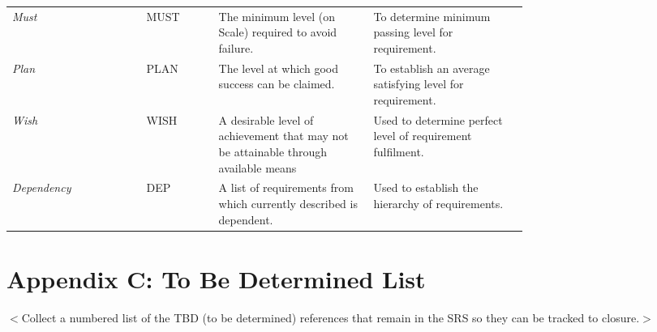 \begin{appendices}
\begin{table}[!htbp]
\begin{tabular}{@{}lp{0.14\linewidth}p{0.3\linewidth}p{0.3\linewidth}@{}}
			\emph{Must}			 	 & MUST    & The minimum level (on Scale) required to avoid failure. & To determine minimum passing level for requirement.\\
			\emph{Plan}				 & PLAN    & The level at which good success can be claimed. & To establish an average satisfying level for requirement. \\
			\emph{Wish}			 	 & WISH    & A desirable level of achievement that may not be attainable through available means & Used to determine perfect level of requirement fulfilment.\\
			\emph{Dependency}		 & DEP     & A list of requirements from which currently described is dependent. & Used to establish the hierarchy of requirements.\\
			\bottomrule
		\end{tabular}
	\end{table}
	\clearpage
	\section{Appendix C: To Be Determined List}
	$<$Collect a numbered list of the TBD (to be determined) references that remain 
	in the SRS so they can be tracked to closure.$>$
\end{appendices}